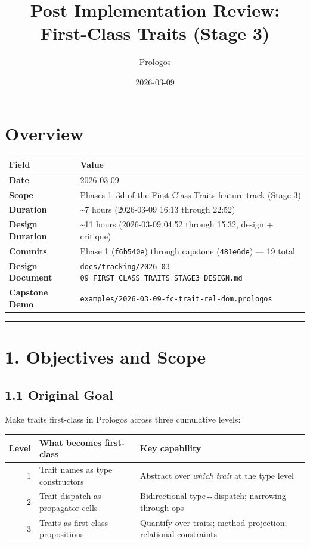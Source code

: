 \documentclass[11pt]{article}
\author{Prologos}
\date{2026-03-09}
\title{Post Implementation Review: First-Class Traits (Stage 3)}
\begin{document}
\maketitle
\setcounter{tocdepth}{2}
\tableofcontents

\section{Overview}
\label{sec:orgdc1a31e}

\begin{center}
\begin{tabular}{ll}
Field & Value\\
\hline
\textbf{Date} & 2026-03-09\\
\textbf{Scope} & Phases 1–3d of the First-Class Traits feature track (Stage 3)\\
\textbf{Duration} & \textasciitilde{}7 hours (2026-03-09 16:13 through 22:52)\\
\textbf{Design Duration} & \textasciitilde{}11 hours (2026-03-09 04:52 through 15:32, design + critique)\\
\textbf{Commits} & Phase 1 (\texttt{f6b540e}) through capstone (\texttt{481e6de}) — 19 total\\
\textbf{Design Document} & \texttt{docs/tracking/2026-03-09\_FIRST\_CLASS\_TRAITS\_STAGE3\_DESIGN.md}\\
\textbf{Capstone Demo} & \texttt{examples/2026-03-09-fc-trait-rel-dom.prologos}\\
\end{tabular}
\end{center}

\noindent\rule{\textwidth}{0.5pt}
\section{1. Objectives and Scope}
\label{sec:org77e71e0}

\subsection{1.1 Original Goal}
\label{sec:orgef3d58f}

Make traits first-class in Prologos across three cumulative levels:

\begin{center}
\begin{tabular}{rll}
Level & What becomes first-class & Key capability\\
\hline
1 & Trait names as type constructors & Abstract over \emph{which trait} at the type level\\
2 & Trait dispatch as propagator cells & Bidirectional type↔dispatch; narrowing through ops\\
3 & Traits as first-class propositions & Quantify over traits; method projection; relational constraints\\
\end{tabular}
\end{center}
\end{document}
